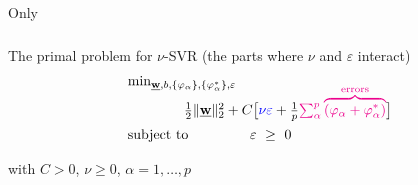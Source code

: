 \begin{frame}{Only}\frametitle{\subsubsecname}



\slidesonly{\vspace{-20mm}}

\begin{minipage}{7.5cm}

\begin{block}{The primal problem for $\nu$-SVR (the parts where $\nu$ and $\varepsilon$ interact)}
\slidesonly{\vspace{-5mm}}
	\begingroup
	\footnotesize
     \begin{equation}
        \begin{array}{ll}
        \min_{\vec w, b,\{\varphi_\alpha\}, \{\varphi_\alpha^*\}, \varepsilon} & \\[-1mm]
        & \kern-11ex\frac{1}{2} \lVert \vec w \rVert_{2}^{2} + C \big\lbrack {\color{blue}\nu \varepsilon} + \frac{1}{p} {\color{magenta}\sum_{\alpha}^p \overbrace{(\varphi_\alpha + \varphi_\alpha^*)}^{\text{errors}}} \big\rbrack\\[2mm]
        \text{subject to} &
        \varepsilon~\ge~0\\
        \end{array}
        \label{eq:primalnuepsonly}
     \end{equation}
     
     \slidesonly{\vspace{-2mm}}
        with $C>0$, $\nu \ge 0$, $\alpha=1,\ldots,p$
     \endgroup
\end{block}
\end{minipage}


\end{frame}
